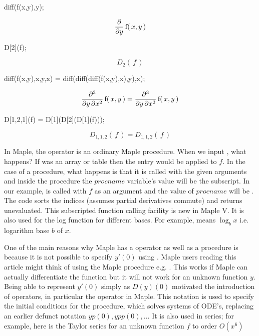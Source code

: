 \documentclass[11pt,dvips]{mtn}
\begin{document}
\begin{mapleinput}
diff(f(x,y),y);
\end{mapleinput}
\begin{maplelatex}
\[
{\frac {{ \partial}}{{ \partial}{y}}}\,{\rm f}(\,{x}, {y}\,)
\]
\end{maplelatex}
\begin{mapleinput}
D[2](f);
\end{mapleinput}
\begin{maplettyout}
\end{maplettyout}
\begin{maplelatex}
\[
{{D}_{2}}(\,{f}\,)
\]
\end{maplelatex}
\begin{mapleinput}
diff(f(x,y),x,y,x) = diff(diff(diff(f(x,y),x),y),x);
\end{mapleinput}
\begin{maplelatex}
\[
{\frac {{ \partial}^{3}}{{ \partial}{y}\,{ \partial}{x}^{2}}}\,
{\rm f}(\,{x}, {y}\,)={\frac {{ \partial}^{3}}{{ \partial}{y}\,{ 
\partial}{x}^{2}}}\,{\rm f}(\,{x}, {y}\,)
\]
\end{maplelatex}
\begin{mapleinput}
D[1,2,1](f) = D[1](D[2](D[1](f)));
\end{mapleinput}
\begin{maplettyout}
\end{maplettyout}
\begin{maplelatex}
\[
{{D}_{1, 1, 2}}(\,{f}\,)={{D}_{1, 1, 2}}(\,{f}\,)
\]
\end{maplelatex}

In Maple, the  operator is an ordinary Maple procedure.
When we input , what happens?
If  was an array or table then the entry 
would be applied to $f$.  In the case of a procedure, what happens
is that it is called with the given arguments and inside
the procedure the $procname$ variable's value will be the subscript.
In our example,  is called with $f$ as an argument
and the value of $procname$ will be .
The  code sorts the indices (assumes partial derivatives commute)
and returns  unevaluated.
This subscripted function calling facility is new in Maple V.
It is also used for the log function for different bases.
For example,  means $\log _b x$ i.e. logarithm base $b$ of $x$.

One of the main reasons why Maple has a  operator as well
as a  procedure is because it is not possible to specify $y'(0)$ using
.  Maple users reading this article might think of
using the Maple  procedure e.g. .
This works if Maple can actually differentiate the function
but it will not work for an unknown function $y$.
Being able to represent $y'(0)$ simply as $D(y)(0)$ motivated the
introduction of operators, in particular the  operator in Maple.
This notation is used to specify the initial conditions for the
 procedure, which solves systems of ODE's,
replacing an earlier defunct notation $yp(0), ypp(0), \ldots$
It is also used in series; for example, here is the
Taylor series for an unknown function $f$ to order $O(x^6)$
\end{document}
